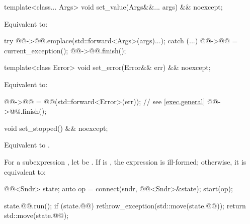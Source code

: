 \begin{itemdecl}
template<class... Args>
void set_value(Args&&... args) && noexcept;
\end{itemdecl}

\begin{itemdescr}
\pnum
\effects
Equivalent to:
\begin{codeblock}
try {
  @@->@@.emplace(std::forward<Args>(args)...);
} catch (...) {
  @@->@@ = current_exception();
}
@@->@@.finish();
\end{codeblock}
\end{itemdescr}

\begin{itemdecl}
template<class Error>
void set_error(Error&& err) && noexcept;
\end{itemdecl}

\begin{itemdescr}
\pnum
\effects
Equivalent to:
\begin{codeblock}
@@->@@ = @@(std::forward<Error>(err));    // see \ref{exec.general}
@@->@@.finish();
\end{codeblock}
\end{itemdescr}

\begin{itemdecl}
void set_stopped() && noexcept;
\end{itemdecl}

\begin{itemdescr}
\pnum
\effects
Equivalent to .
\end{itemdescr}

\pnum
For a subexpression , let  be .
If 
is ,
the expression  is ill-formed;
otherwise, it is equivalent to:
\begin{codeblock}
@@<Sndr> state;
auto op = connect(sndr, @@<Sndr>{&state});
start(op);

state.@@.run();
if (state.@@) {
  rethrow_exception(std::move(state.@@));
}
return std::move(state.@@);
\end{codeblock}


